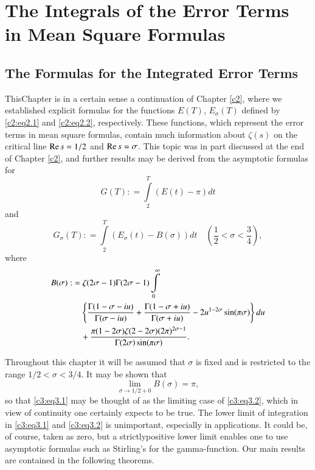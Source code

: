 \chapter{The Integrals of the Error Terms in Mean Square Formulas}\label{c3}

\section{The Formulas for the Integrated Error Terms}\label{c3:sec3.1}

This\pageoriginale Chapter is in a certain sense a continuation of
Chapter \ref{c2}, where we established explicit formulas for the functions
$E(T)$, $E_\sigma(T)$ defined by \eqref{c2:eq2.1} and
\eqref{c2:eq2.2}, respectively. These functions, which represent the
error terms in mean square formulas, contain much information about
$\zeta(s)$ on the critical line $\operatorname{Re} s = 1/2$ and $\operatorname{Re} s =
\sigma$. This topic was in part discussed at the end of Chapter \ref{c2}, and
further results may be derived from the asymptotic formulas for 
\begin{equation}
  G(T): = \int\limits_{2}^T (E(t)- \pi)dt\label{c3:eq3.1}
\end{equation}
and 
\begin{equation}
  G_\sigma (T) : = \int\limits_2^T (E_\sigma (t) - B(\sigma)) dt \quad
  \left(\frac{1}{2} < \sigma < \frac{3}{4}\right),\label{c3:eq3.2}
\end{equation}
where
\begin{align}
  B(\sigma) : & = \zeta (2 \sigma -1)\Gamma (2 \sigma-1)
  \int\limits_0^\infty\notag \label{c3:eq3.3}\\ 
  &\quad \left\{\frac{\Gamma (1- \sigma - iu)}{\Gamma
    (\sigma - iu)}+ \frac{\Gamma (1- \sigma + iu)}{\Gamma(\sigma +
    iu)} -2 u^{1-2 \sigma} \sin (\pi
  \sigma)\right\}du \\
  &\quad+ \frac{\pi (1- 2
    \sigma)\zeta (2 - 2 \sigma) (2 \pi)^{2 \sigma-1}}{\Gamma (2
    \sigma) \sin (\pi \sigma)}.\notag
\end{align}

Throughout this chapter it will be assumed that $\sigma$ is fixed and
is restricted to the range $1/2 < \sigma < 3/4$. It may be shown that 
\begin{equation}
  \lim\limits_{\sigma \to 1/2 + 0} B(\sigma)= \pi, \label{c3:eq3.4}
\end{equation}
so that \eqref{c3:eq3.1} may be thought of as the limiting case of
\eqref{c3:eq3.2}, which in view of continuity one certainly expects to
be true. The lower limit of integration in \eqref{c3:eq3.1} and
\eqref{c3:eq3.2} is unimportant, especially in applications. It could
be, of course, taken as zero, but a strictly\pageoriginale positive
lower limit enables one to use asymptotic formulas such as Stirling's
for the gamma-function. Our main results are contained in the
following theorems.

